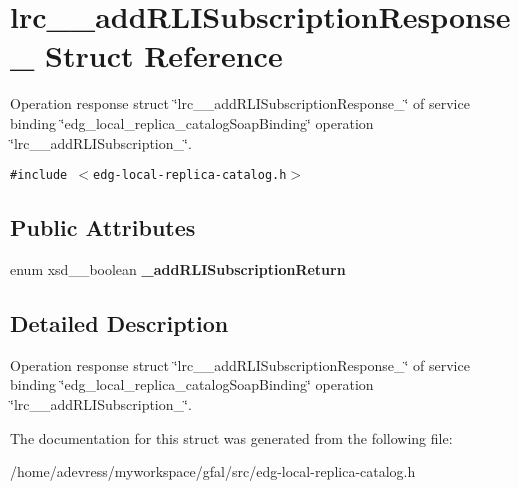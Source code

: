 \section{lrc\_\-\_\-add\-RLISubscription\-Response\_\- Struct Reference}
\label{structlrc____addRLISubscriptionResponse__}
Operation response struct \char`\"{}lrc\_\-\_\-add\-RLISubscription\-Response\_\-\char`\"{} of service binding \char`\"{}edg\_\-local\_\-replica\_\-catalog\-Soap\-Binding\char`\"{} operation \char`\"{}lrc\_\-\_\-add\-RLISubscription\_\-\char`\"{}.  


{\tt \#include $<$edg-local-replica-catalog.h$>$}

\subsection*{Public Attributes}
\begin{CompactItemize}
\item 
enum xsd\_\-\_\-boolean \textbf{\_\-add\-RLISubscription\-Return}\label{structlrc____addRLISubscriptionResponse___32b68f983bcfde42317ce06bce5c7027}

\end{CompactItemize}


\subsection{Detailed Description}
Operation response struct \char`\"{}lrc\_\-\_\-add\-RLISubscription\-Response\_\-\char`\"{} of service binding \char`\"{}edg\_\-local\_\-replica\_\-catalog\-Soap\-Binding\char`\"{} operation \char`\"{}lrc\_\-\_\-add\-RLISubscription\_\-\char`\"{}. 



The documentation for this struct was generated from the following file:\begin{CompactItemize}
\item 
/home/adevress/myworkspace/gfal/src/edg-local-replica-catalog.h\end{CompactItemize}

